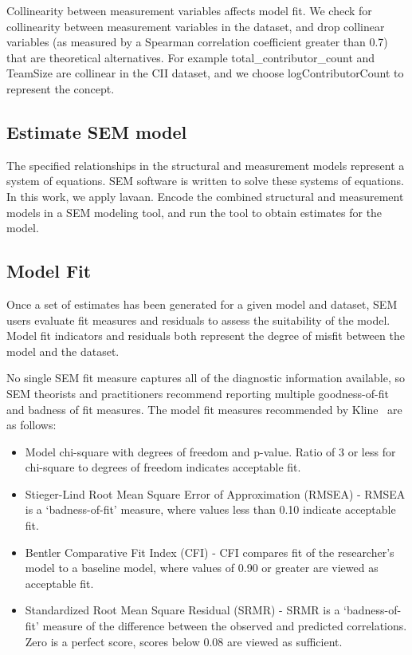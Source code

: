 Collinearity between measurement variables affects model fit. We check for collinearity between measurement variables in the dataset, and drop collinear variables (as measured by a Spearman correlation coefficient greater than 0.7) that are theoretical alternatives. For example total\_contributor\_count and TeamSize are collinear in the CII dataset, and we choose logContributorCount to represent the concept.

\subsection{Estimate SEM model} 
The specified relationships in the structural and measurement models represent a system of equations. SEM software is written to solve these systems of equations. In this work, we apply lavaan.  Encode the combined structural and measurement models in a SEM modeling tool, and run the tool to obtain estimates for the model. 

\subsection{Model Fit}
Once a set of estimates has been generated for a given model and dataset, SEM users evaluate fit measures and residuals to assess the suitability of the model. Model fit indicators and residuals both represent the degree of misfit between the model and the dataset. 

No single SEM fit measure captures all of the diagnostic information available, so SEM theorists and practitioners recommend reporting multiple goodness-of-fit and badness of fit measures.
The model fit measures recommended by Kline~\cite{kline2015principles} are as follows:
\begin{itemize}
	\item Model chi-square with degrees of freedom and p-value. Ratio of 3 or less for chi-square to degrees of freedom indicates acceptable fit.
	\item Stieger-Lind Root Mean Square Error of Approximation (RMSEA) - RMSEA is a `badness-of-fit' measure, where values less than 0.10 indicate acceptable fit.
	\item Bentler Comparative Fit Index (CFI) - CFI compares fit of the researcher's model to a baseline model, where values of 0.90 or greater are viewed as acceptable fit.
	\item Standardized Root Mean Square Residual (SRMR) - SRMR is a `badness-of-fit' measure of the difference between the observed and predicted correlations. Zero is a perfect score, scores below 0.08 are viewed as sufficient.
\end{itemize}


